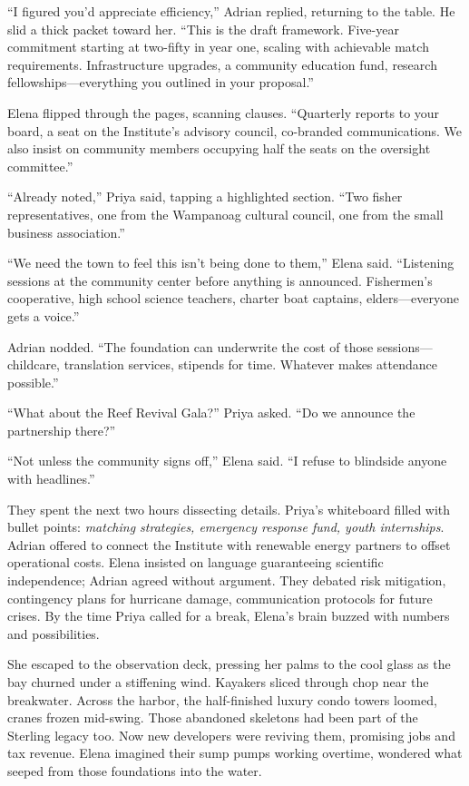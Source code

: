 “I figured you’d appreciate efficiency,” Adrian replied, returning to the table. He slid a thick packet toward her. “This is the draft framework. Five-year commitment starting at two-fifty in year one, scaling with achievable match requirements. Infrastructure upgrades, a community education fund, research fellowships—everything you outlined in your proposal.”

Elena flipped through the pages, scanning clauses. “Quarterly reports to your board, a seat on the Institute’s advisory council, co-branded communications. We also insist on community members occupying half the seats on the oversight committee.”

“Already noted,” Priya said, tapping a highlighted section. “Two fisher representatives, one from the Wampanoag cultural council, one from the small business association.”

“We need the town to feel this isn’t being done to them,” Elena said. “Listening sessions at the community center before anything is announced. Fishermen’s cooperative, high school science teachers, charter boat captains, elders—everyone gets a voice.”

Adrian nodded. “The foundation can underwrite the cost of those sessions—childcare, translation services, stipends for time. Whatever makes attendance possible.”

“What about the Reef Revival Gala?” Priya asked. “Do we announce the partnership there?”

“Not unless the community signs off,” Elena said. “I refuse to blindside anyone with headlines.”

They spent the next two hours dissecting details. Priya’s whiteboard filled with bullet points: \textit{matching strategies, emergency response fund, youth internships}. Adrian offered to connect the Institute with renewable energy partners to offset operational costs. Elena insisted on language guaranteeing scientific independence; Adrian agreed without argument. They debated risk mitigation, contingency plans for hurricane damage, communication protocols for future crises. By the time Priya called for a break, Elena’s brain buzzed with numbers and possibilities.

She escaped to the observation deck, pressing her palms to the cool glass as the bay churned under a stiffening wind. Kayakers sliced through chop near the breakwater. Across the harbor, the half-finished luxury condo towers loomed, cranes frozen mid-swing. Those abandoned skeletons had been part of the Sterling legacy too. Now new developers were reviving them, promising jobs and tax revenue. Elena imagined their sump pumps working overtime, wondered what seeped from those foundations into the water.

